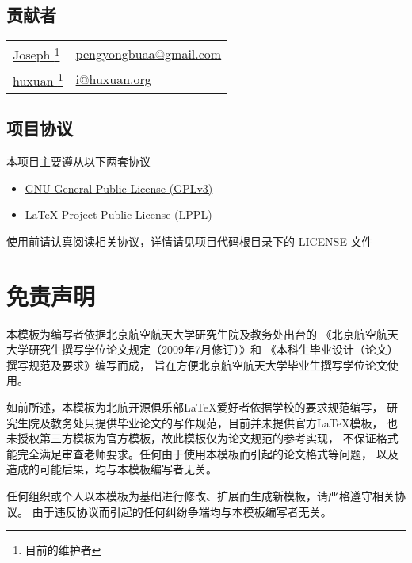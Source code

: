 \subsection{贡献者}
\begin{tabularx}{\textwidth}{@{\hspace{2em}}ll}
    \href{https://github.com/JosephPeng/}{Joseph \footnote{目前的维护者}} &
    \href{mailto:pengyongbuaa@gmail.com}{pengyongbuaa@gmail.com} \\
    \href{http://huxuan.org/}{huxuan \textsuperscript{1}} &
    \href{mailto:i@huxuan.org}{i@huxuan.org} \\
\end{tabularx}

\subsection{项目协议}
本项目主要遵从以下两套协议
\begin{itemize}
    \item \href{http://www.gnu.org/licenses/gpl.txt}
        {GNU General Public License (GPLv3)}
    \item \href{http://www.latex-project.org/lppl.txt}
        {\LaTeX{} Project Public License (LPPL)}
\end{itemize}
使用前请认真阅读相关协议，详情请见项目代码根目录下的 LICENSE 文件

\section{免责声明}
本模板为编写者依据北京航空航天大学研究生院及教务处出台的
《北京航空航天大学研究生撰写学位论文规定（2009年7月修订）》和
《本科生毕业设计（论文）撰写规范及要求》编写而成，
旨在方便北京航空航天大学毕业生撰写学位论文使用。

如前所述，本模板为北航开源俱乐部\LaTeX{}爱好者依据学校的要求规范编写，
研究生院及教务处只提供毕业论文的写作规范，目前并未提供官方\LaTeX{}模板，
也未授权第三方模板为官方模板，故此模板仅为论文规范的参考实现，
不保证格式能完全满足审查老师要求。任何由于使用本模板而引起的论文格式等问题，
以及造成的可能后果，均与本模板编写者无关。

任何组织或个人以本模板为基础进行修改、扩展而生成新模板，请严格遵守相关协议。
由于违反协议而引起的任何纠纷争端均与本模板编写者无关。


